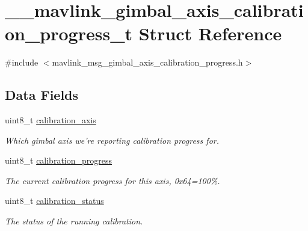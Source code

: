\hypertarget{struct____mavlink__gimbal__axis__calibration__progress__t}{\section{\+\_\+\+\_\+mavlink\+\_\+gimbal\+\_\+axis\+\_\+calibration\+\_\+progress\+\_\+t Struct Reference}
\label{struct____mavlink__gimbal__axis__calibration__progress__t}
}


{\ttfamily \#include $<$mavlink\+\_\+msg\+\_\+gimbal\+\_\+axis\+\_\+calibration\+\_\+progress.\+h$>$}

\subsection*{Data Fields}
\begin{DoxyCompactItemize}
\item 
uint8\+\_\+t \hyperlink{struct____mavlink__gimbal__axis__calibration__progress__t_a8b4de13a7041898d4df3566171c8f221}{calibration\+\_\+axis}
\begin{DoxyCompactList}\small\item\em Which gimbal axis we're reporting calibration progress for. \end{DoxyCompactList}\item 
uint8\+\_\+t \hyperlink{struct____mavlink__gimbal__axis__calibration__progress__t_a0ad1422ac5a377edf96ba76dd27e428e}{calibration\+\_\+progress}
\begin{DoxyCompactList}\small\item\em The current calibration progress for this axis, 0x64=100\%. \end{DoxyCompactList}\item 
uint8\+\_\+t \hyperlink{struct____mavlink__gimbal__axis__calibration__progress__t_a2531a638bfb57951f9e97e0e0f7f4ae0}{calibration\+\_\+status}
\begin{DoxyCompactList}\small\item\em The status of the running calibration. \end{DoxyCompactList}\end{DoxyCompactItemize}


